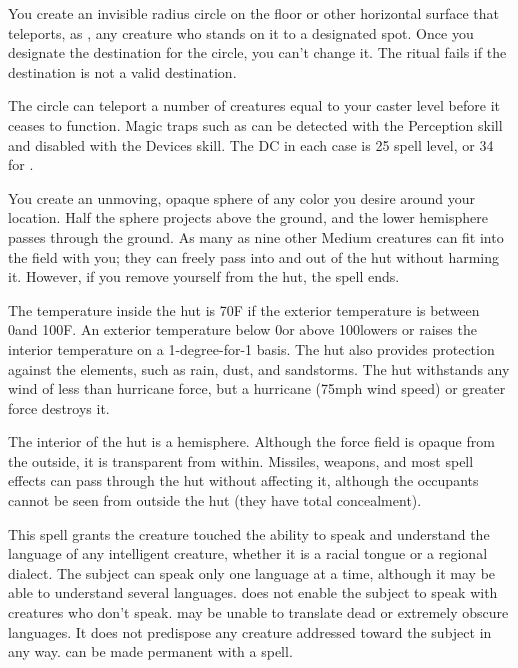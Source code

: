 \spelleffect You create an invisible \areasmall radius circle on the floor or other horizontal surface that teleports, as , any creature who stands on it to a designated spot. Once you designate the destination for the circle, you can't change it. The ritual fails if the destination is not a valid destination.
\par The circle can teleport a number of creatures equal to your caster level before it ceases to function.
\spellnotes Magic traps such as  can be detected with the Perception skill and disabled with the Devices skill. The DC in each case is 25 \add spell level, or 34 for .

\spelldur{\durext \dismissable}
\spelleffect You create an unmoving, opaque sphere of any color you desire around your location. Half the sphere projects above the ground, and the lower hemisphere passes through the ground. As many as nine other Medium creatures can fit into the field with you; they can freely pass into and out of the hut without harming it. However, if you remove yourself from the hut, the spell ends.
\par The temperature inside the hut is 70\degree F if the exterior temperature is between 0\degree and 100\degree F. An exterior temperature below 0\degree or above 100\degree lowers or raises the interior temperature on a 1-degree-for-1 basis. The hut also provides protection against the elements, such as rain, dust, and sandstorms. The hut withstands any wind of less than hurricane force, but a hurricane (75\add mph wind speed) or greater force destroys it.
\par The interior of the hut is a hemisphere. Although the force field is opaque from the outside, it is transparent from within. Missiles, weapons, and most spell effects can pass through the hut without affecting it, although the occupants cannot be seen from outside the hut (they have total concealment).

\spelldur{\durlong}
\spelleffect This spell grants the creature touched the ability to speak and understand the language of any intelligent creature, whether it is a racial tongue or a regional dialect. The subject can speak only one language at a time, although it may be able to understand several languages.  does not enable the subject to speak with creatures who don't speak.
\spellnotes {} may be unable to translate dead or extremely obscure languages. It does not predispose any creature addressed toward the subject in any way.  can be made permanent with a  spell.

